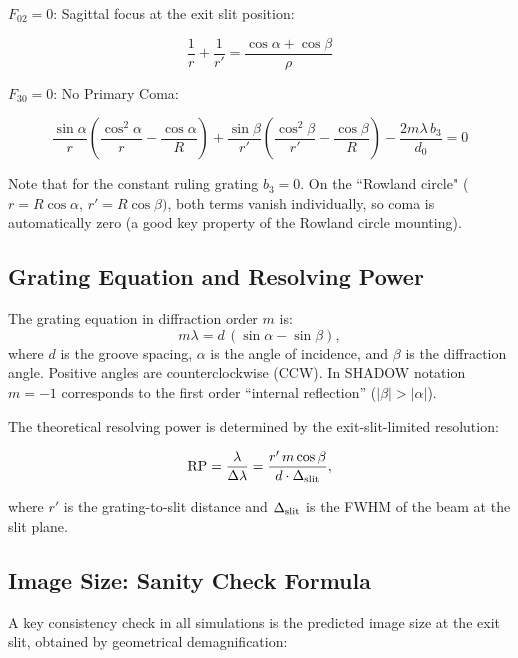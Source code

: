 \documentclass[12pt,a4paper]{article}
\newcommand{\al}{\alpha}
\newcommand{\be}{\beta}
\newcommand{\la}{\lambda}
\newcommand{\RP}{\mathrm{RP}}
\begin{document}
$F_{02} = 0$: Sagittal focus at the exit slit position:

\begin{equation}
\frac{1}{r} + \frac{1}{r'} = \frac{\cos\alpha + \cos\beta}{\rho}
\end{equation}

$F_{30} = 0$: No Primary Coma:

\begin{equation}
    \frac{\sin\alpha}{r}\left(\frac{\cos^2\alpha}{r} - \frac{\cos\alpha}{R}\right) + \frac{\sin\beta}{r'}\left(\frac{\cos^2\beta}{r'} - \frac{\cos\beta}{R}\right) - \frac{2m\lambda\, b_3}{d_0} = 0
\end{equation}

Note that for the constant ruling grating $b_3=0$. On the ``Rowland circle" ($r = R \cos\alpha$, $r' = R \cos\beta)$, both terms vanish individually, so coma is automatically zero (a good key property of the Rowland circle mounting).

\subsection{Grating Equation and Resolving Power}

The grating equation in diffraction order $m$ is:
\begin{equation}
  m\la = d\,(\sin\al - \sin\be),
  \label{eq:grating}
\end{equation}
where $d$ is the groove spacing, $\al$ is the angle of incidence,
and $\be$ is the diffraction angle. Positive angles are counterclockwise (CCW). In SHADOW notation
$m = -1$  corresponds to the first order ``internal reflection'' ($|\be| > |\al|$).

The theoretical resolving power is determined by the exit-slit-limited resolution:
\begin{keyresult}
\begin{equation}
  \RP = \frac{\la}{\Delta\la}
       = \frac{r'\,m\cos\be}{d\cdot\Delta_{\rm slit}},
  \label{eq:RP}
\end{equation}
\end{keyresult}
where $r'$ is the grating-to-slit distance and $\Delta_{\rm slit}$ is the FWHM of the
beam at the slit plane.

\subsection{Image Size: Sanity Check Formula}

A key consistency check in all simulations is the predicted image size at the exit slit,
obtained by geometrical demagnification:
\end{document}
